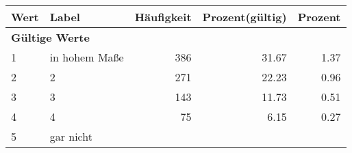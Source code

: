      \begin{longtable}{lXrrr}
     \toprule
     \textbf{Wert} & \textbf{Label} & \textbf{Häufigkeit} & \textbf{Prozent(gültig)} & \textbf{Prozent} \\
     \endhead
     \midrule
     \multicolumn{5}{l}{\textbf{Gültige Werte}}\\

     1 &
     \multicolumn{1}{X}{ in hohem Maße   } &


       \num{386} &
       \num[round-mode=places,round-precision=2]{31.67} &
         \num[round-mode=places,round-precision=2]{1.37} \\

     2 &
     \multicolumn{1}{X}{ 2   } &


       \num{271} &
       \num[round-mode=places,round-precision=2]{22.23} &
         \num[round-mode=places,round-precision=2]{0.96} \\

     3 &
     \multicolumn{1}{X}{ 3   } &


       \num{143} &
       \num[round-mode=places,round-precision=2]{11.73} &
         \num[round-mode=places,round-precision=2]{0.51} \\

     4 &
     \multicolumn{1}{X}{ 4   } &


       \num{75} &
       \num[round-mode=places,round-precision=2]{6.15} &
         \num[round-mode=places,round-precision=2]{0.27} \\

     5 &
     \multicolumn{1}{X}{ gar nicht   } &



\end{longtable}
